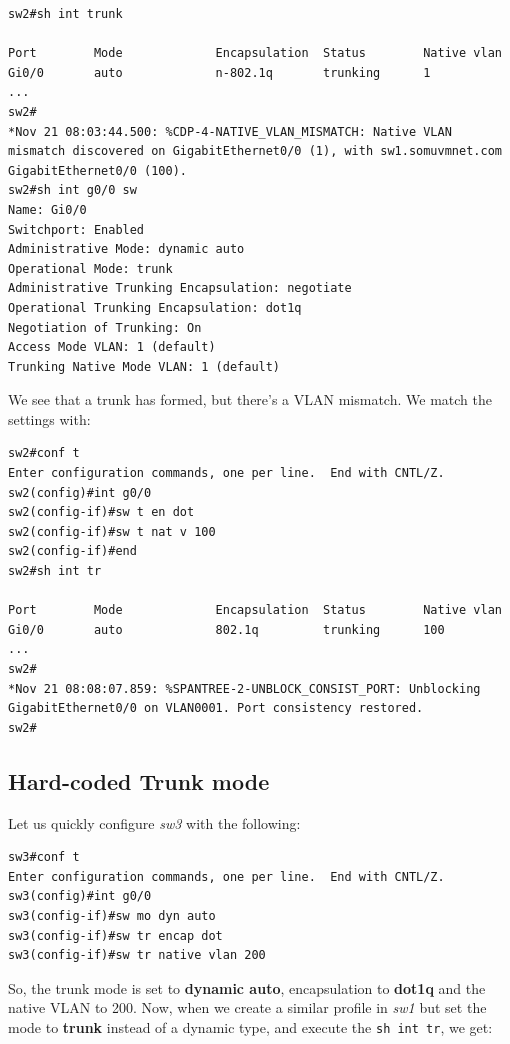 \vspace{-15pt}
\begin{verbatim}
sw2#sh int trunk

Port        Mode             Encapsulation  Status        Native vlan
Gi0/0       auto             n-802.1q       trunking      1
...
sw2#
*Nov 21 08:03:44.500: %CDP-4-NATIVE_VLAN_MISMATCH: Native VLAN mismatch discovered on GigabitEthernet0/0 (1), with sw1.somuvmnet.com GigabitEthernet0/0 (100).
sw2#sh int g0/0 sw
Name: Gi0/0
Switchport: Enabled
Administrative Mode: dynamic auto
Operational Mode: trunk
Administrative Trunking Encapsulation: negotiate
Operational Trunking Encapsulation: dot1q
Negotiation of Trunking: On
Access Mode VLAN: 1 (default)
Trunking Native Mode VLAN: 1 (default)
\end{verbatim}
\vspace{-10pt}

\noindent
We see that a trunk has formed, but there's a VLAN mismatch. We match the settings with: 

\vspace{-15pt}
\begin{verbatim}
sw2#conf t
Enter configuration commands, one per line.  End with CNTL/Z.
sw2(config)#int g0/0
sw2(config-if)#sw t en dot
sw2(config-if)#sw t nat v 100
sw2(config-if)#end
sw2#sh int tr

Port        Mode             Encapsulation  Status        Native vlan
Gi0/0       auto             802.1q         trunking      100
...
sw2#
*Nov 21 08:08:07.859: %SPANTREE-2-UNBLOCK_CONSIST_PORT: Unblocking GigabitEthernet0/0 on VLAN0001. Port consistency restored.
sw2#
\end{verbatim}
\vspace{-10pt}

\subsection{Hard-coded Trunk mode}
Let us quickly configure \textit{sw3} with the following: 

\vspace{-15pt}
\begin{verbatim}
sw3#conf t
Enter configuration commands, one per line.  End with CNTL/Z.
sw3(config)#int g0/0
sw3(config-if)#sw mo dyn auto
sw3(config-if)#sw tr encap dot
sw3(config-if)#sw tr native vlan 200
\end{verbatim}
\vspace{-10pt}

\noindent
So, the trunk mode is set to \textbf{dynamic auto}, encapsulation to \textbf{dot1q} and the native VLAN to 200. Now, when we create a similar profile in \textit{sw1} but set the mode to \textbf{trunk} instead of a dynamic type, and execute the \verb|sh int tr|, we get:

